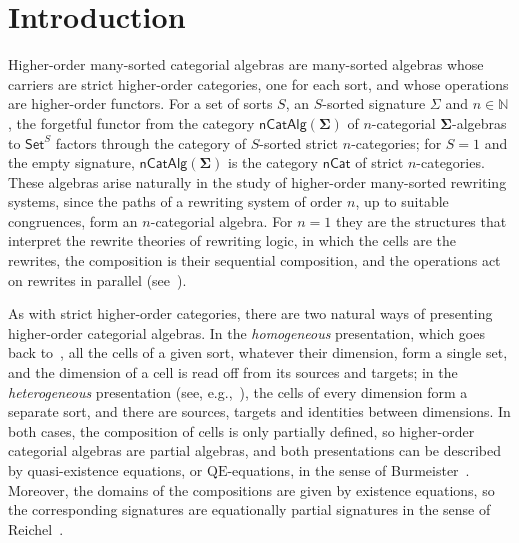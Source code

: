 \documentclass[a4paper, reqno]{amsbook}
\newcommand{\sig}[1]{\mathbf{#1}}             %
\newcommand{\QE}{\mathrm{QE}}
\theoremstyle{plain}
\theoremstyle{definition}
\begin{document}
\setcounter{tocdepth}{1}
\tableofcontents

\mainmatter



\chapter{Introduction}\label{SIntroduction}

Higher-order many-sorted categorial algebras are many-sorted algebras whose carriers are strict higher-order categories, one for each sort, and whose operations are higher-order functors.
For a set of sorts $S$, an $S$-sorted signature $\Sigma$ and $n\in\mathbb{N}$, the forgetful functor from the category $\mathsf{nCatAlg}(\sig{\Sigma})$ of $n$-categorial $\sig{\Sigma}$-algebras to $\mathsf{Set}^{S}$ factors through the category of $S$-sorted strict $n$-categories; for $S=1$ and the empty signature, $\mathsf{nCatAlg}(\sig{\Sigma})$ is the category $\mathsf{nCat}$ of strict $n$-categories.
These algebras arise naturally in the study of higher-order many-sorted rewriting systems, since the paths of a rewriting system of order $n$, up to suitable congruences, form an $n$-categorial algebra.
For $n=1$ they are the structures that interpret the rewrite theories of rewriting logic, in which the cells are the rewrites, the composition is their sequential composition, and the operations act on rewrites in parallel (see~\cite{Meseguer1992}).

As with strict higher-order categories, there are two natural ways of presenting higher-order categorial algebras.
In the \emph{homogeneous} presentation, which goes back to~\cite{Street1987}, all the cells of a given sort, whatever their dimension, form a single set, and the dimension of a cell is read off from its sources and targets; in the \emph{heterogeneous} presentation (see, e.g.,~\cite{AraEtAl2025}), the cells of every dimension form a separate sort, and there are sources, targets and identities between dimensions.
In both cases, the composition of cells is only partially defined, so higher-order categorial algebras are partial algebras, and both presentations can be described by quasi-existence equations, or $\QE$-equations, in the sense of Burmeister~\cite{Burmeister1986, Burmeister2002}.
Moreover, the domains of the compositions are given by existence equations, so the corresponding signatures are equationally partial signatures in the sense of Reichel~\cite{Reichel1987}.
\end{document}
